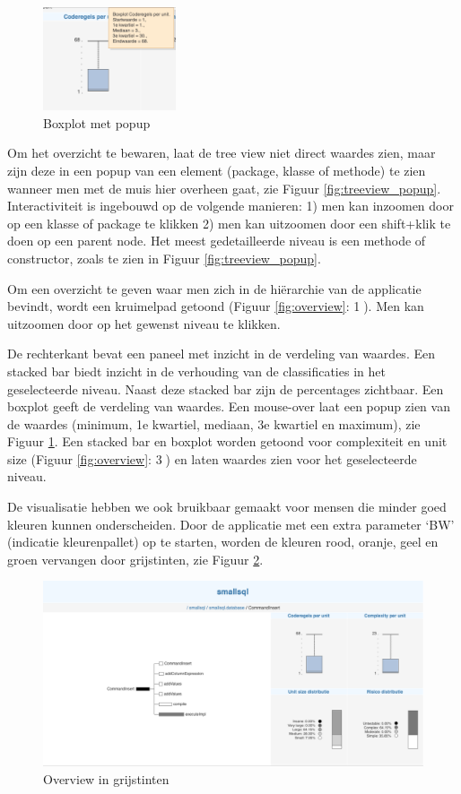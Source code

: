 \documentclass[a4paper]{article}
\begin{document}
\begin{figure}
\begin{center}
  \includegraphics[width=0.35\textwidth]{images/boxplot_popup.png}
  \end{center}
  \caption{Boxplot met popup}
  \label{fig:boxplot_popup}
\end{figure}
Om het overzicht te bewaren, laat de tree view niet direct waardes zien, maar zijn deze in een popup van een element (package, klasse of methode) te zien wanneer men met de muis hier overheen gaat, zie Figuur \ref{fig:treeview_popup}. Interactiviteit is ingebouwd op de volgende manieren: 1) men kan inzoomen door op een klasse of package te klikken 2) men kan uitzoomen door een shift+klik te doen op een parent node. Het meest gedetailleerde niveau is een methode of constructor, zoals te zien in Figuur \ref{fig:treeview_popup}.

Om een overzicht te geven waar men zich in de hiërarchie van de applicatie bevindt, wordt een kruimelpad getoond (Figuur \ref{fig:overview}: \textcircled{1}). Men kan uitzoomen door op het gewenst niveau te klikken.


De rechterkant bevat een paneel met inzicht in de verdeling van waardes. Een stacked bar biedt inzicht in de verhouding van de classificaties in het \mbox{geselecteerde} niveau. Naast deze stacked bar zijn de percentages zichtbaar. Een boxplot geeft de verdeling van waardes. Een mouse-over laat een popup zien van de waardes (minimum, 1e kwartiel, mediaan, 3e kwartiel en maximum), zie Figuur \ref{fig:boxplot_popup}.
Een stacked bar en boxplot worden getoond voor complexiteit en unit size (Figuur \ref{fig:overview}: \textcircled{3}) en laten waardes zien voor het geselecteerde niveau.

De visualisatie hebben we ook bruikbaar gemaakt voor mensen die minder goed kleuren kunnen onderscheiden. Door de applicatie met een extra parameter ‘BW’ (indicatie kleurenpallet) op te starten, worden de kleuren rood, oranje, geel en groen vervangen door grijstinten, zie Figuur \ref{fig:overview_blackwhite}.
\begin{figure}[h]
\centering
  \includegraphics[width=0.8\linewidth]{images/overview_blackwhite.png}
  \caption{Overview in grijstinten}
  \label{fig:overview_blackwhite}
\end{figure}
\end{document}
